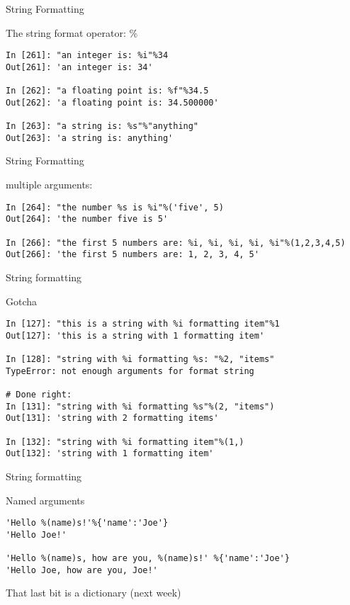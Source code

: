 \documentclass{beamer}
\begin{document}
\begin{frame}[fragile]{String Formatting}

{\Large The string format operator: \%}

\begin{verbatim}
In [261]: "an integer is: %i"%34
Out[261]: 'an integer is: 34'

In [262]: "a floating point is: %f"%34.5
Out[262]: 'a floating point is: 34.500000'

In [263]: "a string is: %s"%"anything"
Out[263]: 'a string is: anything'
\end{verbatim}

\end{frame} 

\begin{frame}[fragile]{String Formatting}

{\Large multiple arguments:}

\begin{verbatim}
In [264]: "the number %s is %i"%('five', 5)
Out[264]: 'the number five is 5'

In [266]: "the first 5 numbers are: %i, %i, %i, %i, %i"%(1,2,3,4,5)
Out[266]: 'the first 5 numbers are: 1, 2, 3, 4, 5'

\end{verbatim}

\end{frame} 

\begin{frame}[fragile]{String formatting}

{\Large Gotcha}

\begin{verbatim}
In [127]: "this is a string with %i formatting item"%1 
Out[127]: 'this is a string with 1 formatting item'

In [128]: "string with %i formatting %s: "%2, "items" 
TypeError: not enough arguments for format string

# Done right:
In [131]: "string with %i formatting %s"%(2, "items")
Out[131]: 'string with 2 formatting items'

In [132]: "string with %i formatting item"%(1,)
Out[132]: 'string with 1 formatting item' 
\end{verbatim}

\end{frame}

\begin{frame}[fragile]{String formatting}

{\Large Named arguments}

\begin{verbatim}
'Hello %(name)s!'%{'name':'Joe'}
'Hello Joe!'

'Hello %(name)s, how are you, %(name)s!' %{'name':'Joe'}
'Hello Joe, how are you, Joe!'
\end{verbatim}
\vfill
{\Large That last bit is a dictionary (next week) }

\end{frame}
\end{document}
